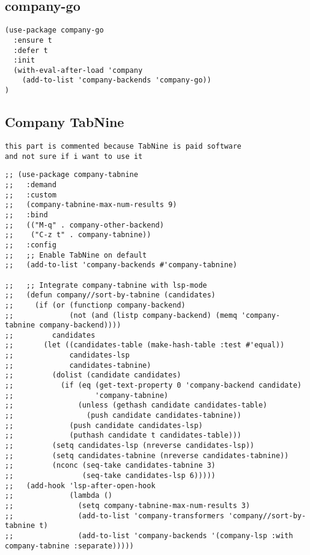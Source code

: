 \documentclass[11pt]{article}
\begin{document}
\subsection*{company-go}
\label{sec:org0e9ec81}
\begin{verbatim}
(use-package company-go
  :ensure t
  :defer t
  :init
  (with-eval-after-load 'company
    (add-to-list 'company-backends 'company-go))
)
\end{verbatim}

\subsection*{Company TabNine}
\label{sec:org52bb604}
\begin{verbatim}
this part is commented because TabNine is paid software
and not sure if i want to use it
\end{verbatim}

\begin{verbatim}
;; (use-package company-tabnine
;;   :demand
;;   :custom
;;   (company-tabnine-max-num-results 9)
;;   :bind
;;   (("M-q" . company-other-backend)
;;    ("C-z t" . company-tabnine))
;;   :config
;;   ;; Enable TabNine on default
;;   (add-to-list 'company-backends #'company-tabnine)

;;   ;; Integrate company-tabnine with lsp-mode
;;   (defun company//sort-by-tabnine (candidates)
;;     (if (or (functionp company-backend)
;;             (not (and (listp company-backend) (memq 'company-tabnine company-backend))))
;;         candidates
;;       (let ((candidates-table (make-hash-table :test #'equal))
;;             candidates-lsp
;;             candidates-tabnine)
;;         (dolist (candidate candidates)
;;           (if (eq (get-text-property 0 'company-backend candidate)
;;                   'company-tabnine)
;;               (unless (gethash candidate candidates-table)
;;                 (push candidate candidates-tabnine))
;;             (push candidate candidates-lsp)
;;             (puthash candidate t candidates-table)))
;;         (setq candidates-lsp (nreverse candidates-lsp))
;;         (setq candidates-tabnine (nreverse candidates-tabnine))
;;         (nconc (seq-take candidates-tabnine 3)
;;                (seq-take candidates-lsp 6)))))
;;   (add-hook 'lsp-after-open-hook
;;             (lambda ()
;;               (setq company-tabnine-max-num-results 3)
;;               (add-to-list 'company-transformers 'company//sort-by-tabnine t)
;;               (add-to-list 'company-backends '(company-lsp :with company-tabnine :separate)))))
\end{verbatim}
\end{document}
